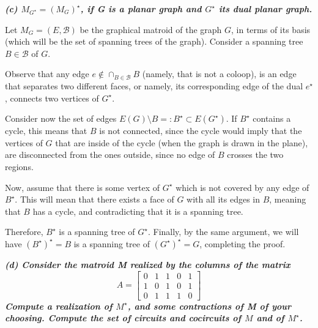 \vspace{3pt}

\hspace{5pt} \textbf{\textit{(c) $M_{G^\star} = \left(M_G\right)^\star$, if G is a planar graph and $G^\star$ its dual planar graph.}}

\vspace{3pt}

Let $M_G = (E, \mathcal B)$ be the graphical matroid of the graph $G$, in terms of its basis (which will be the set of spanning trees of the graph). Consider a spanning tree $B \in \mathcal B$ of $G$.

Observe that any edge $e \notin \cap_{B \in \mathcal B} B$ (namely, that is not a coloop), is an edge that separates two different faces, or namely, its corresponding edge of the dual $e^\star$, connects two vertices of $G^\star$. 

Consider now the set of edges $E(G) \setminus B =: B^\star \subset E(G^\star)$. If $B^\star$ contains a cycle, this means that $B$ is not connected, since the cycle would imply that the vertices of $G$ that are inside of the cycle (when the graph is drawn in the plane), are disconnected from the ones outside, since no edge of $B$ crosses the two regions.

Now, assume that there is some vertex of $G^\star$ which is not covered by any edge of $B^\star$. This will mean that there exists a face of $G$ with all its edges in $B$, meaning that $B$ has a cycle, and contradicting that it is a spanning tree.

Therefore, $B^\star$ is a spanning tree of $G^\star$. Finally, by the same argument, we will have $(B^\star)^\star = B$ is a spanning tree of $(G^\star)^\star = G$, completing the proof.
\vspace{3pt}

\hspace{5pt} \textbf{\textit{(d) Consider the matroid M realized by the columns of the matrix}}
$$
A = \left[
    \begin{array}{ccccc}
        0 & 1 & 1 & 0 & 1 \\
        1 & 0 & 1 & 0 & 1 \\
        0 & 1 & 1 & 1 & 0
    \end{array}
\right]
$$
\textbf{\textit{Compute a realization of $M^\star$, and some contractions of M of your choosing. Compute the set of circuits and cocircuits of $M$ and of $M^\star$.}}

\vspace{5pt}

